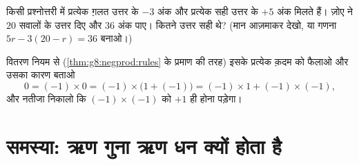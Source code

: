 \begin{exercise}[$\star\star$]\label{exo:g8:negprod:10}
किसी प्रश्नोत्तरी में प्रत्येक ग़लत उत्तर के $-3$ अंक और प्रत्येक
सही उत्तर के $+5$ अंक मिलते हैं। ज़ोए ने $20$ सवालों के उत्तर दिए
और $36$ अंक पाए। कितने उत्तर सही थे? (मान आज़माकर देखो, या गणना
$5r - 3(20 - r) = 36$ बनाओ।)
\end{exercise}

\begin{exercise}[$\star\star\star$]\label{exo:g8:negprod:11}
वितरण नियम से (\cref{thm:g8:negprod:rules} के प्रमाण की तरह) इसके
प्रत्येक क़दम को फैलाओ और उसका कारण बताओ
\[
0 = (-1) \times 0 = (-1) \times \bigl(1 + (-1)\bigr)
= (-1) \times 1 + (-1) \times (-1),
\]
और नतीजा निकालो कि $(-1) \times (-1)$ को $+1$ ही होना पड़ेगा।
\end{exercise}

\section{समस्या: ऋण गुना ऋण धन क्यों होता है}

